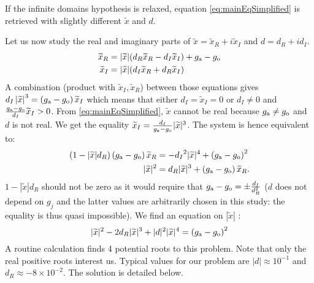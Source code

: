 \begin{remark}
If the infinite domains hypothesis is relaxed, equation \eqref{eq:mainEqSimplified} is retrieved with slightly different $\widetilde{x}$ and $d$.
\end{remark}
Let us now study the real and imaginary parts of $\widetilde{x}=\widetilde{x}_R+i{\widetilde{x}_I}$ and $d={d_R}+i{d_I}$.
\begin{equation}
    \begin{aligned}
    \widetilde{x}_R &= |\widetilde{x}|({d_R} \widetilde{x}_R - {d_I}{\widetilde{x}_I}) +g_{\rm a} - g_{\rm o} \\
    {\widetilde{x}_I} &= |\widetilde{x}|({d_I}\widetilde{x}_R + {d_R}{\widetilde{x}_I})
    \end{aligned}
\end{equation}
A combination (product with ${\widetilde{x}_I}, \widetilde{x}_R$)
between those equations gives
${d_I}\left|\widetilde{x}\right|^3 = \left(g_{\rm a} - g_{\rm o}\right) {\widetilde{x}_I}$ which means that either ${d_I}=\widetilde{x}_I=0$ or ${d_I}\neq 0$ and $\frac{g_{\rm a} - g_{\rm o}}{{d_I}}{\widetilde{x}_I}>0$.
From \eqref{eq:mainEqSimplified}, $\widetilde{x}$ cannot be real because $g_{\rm a} \neq g_{\rm o}$ and $d$ is not real.
We get the equality
$\widetilde{x}_I = \frac{{d_I}}{g_{\rm a} - g_{\rm o}} |\widetilde{x}|^3$.
The system is hence equivalent to:
\begin{equation}
    \begin{aligned}
    \left(1 - |\widetilde{x}| d_R\right)
    \left(g_{\rm a} - g_{\rm o}\right)\widetilde{x}_R &=
    -{d_I}^2 |\widetilde{x}|^4 + \left(g_{\rm a} - g_{\rm o}\right)^2 \\
    |\widetilde{x}|^2 &=
    {d_R} |\widetilde{x}|^3 + \left(g_{\rm a} - g_{\rm o}\right)\widetilde{x}_R.
    \end{aligned}
\end{equation}
$1 - |\widetilde{x}| d_R$ should not be zero as it would require that $g_{\rm a} - g_{\rm o} = \pm \frac{d_I}{d_R^2}$ ($d$ does not depend on $g_j$ and the latter values are arbitrarily chosen in this study: the equality is thus quasi impossible).
We find an equation on $|\widetilde{x}|$ :
\begin{equation} \label{eq:mainPolynomial}
    |\widetilde{x}|^2 -  2{d_R} |\widetilde{x}|^3 + 
    |d|^2 |\widetilde{x}|^4
    =\left(g_{\rm a} - g_{\rm o}\right)^2
\end{equation}
A routine calculation finds 4 potential roots to this problem. Note that only the real positive roots interest us. Typical values for our problem 
are 
$|d| \approx 10^{-1}$ and $d_R \approx -8 \times 10^{-2}$.
The solution is detailed below.
